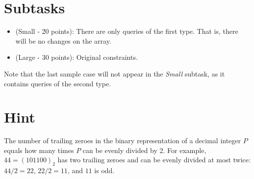 \section*{Subtasks}
\begin{itemize}
\item (Small - 20 points): There are only queries of the first type. That is, there will be no changes on the array.
\item (Large - 30 points): Original constraints.
\end{itemize}

Note that the last sample case will not appear in the {\it Small} subtask, as it contains queries of the second type.

\section*{Hint}
The number of trailing zeroes in the binary representation of a decimal integer $P$ equals how many times $P$ can be evenly divided by 2. For example, $44 = (101100)_2$ has two trailing zeroes and can be evenly divided at most twice: $44 / 2 = 22$, $22 / 2 = 11$, and $11$ is odd.